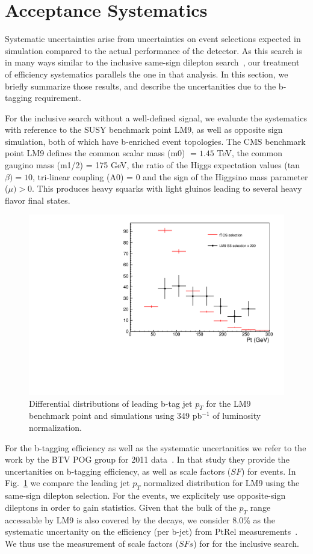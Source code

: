 \section{Acceptance Systematics}
\label{sec:systematic}
Systematic uncertainties arise from uncertainties on event selections expected in simulation compared to the actual performance of 
the detector. As this search is in many ways similar to the inclusive same-sign dilepton search~\cite{ssnote2011}, 
our treatment of efficiency systematics parallels the one in that analysis.
In this section, we briefly summarize those results, and
describe the uncertanities due to the b-tagging requirement.

For the inclusive search without a well-defined signal, 
we evaluate the systematics with reference to the SUSY benchmark point LM9, 
as well as opposite sign \ttbar simulation, both of which have b-enriched event topologies. The CMS benchmark point LM9 defines the 
common scalar mass (m0) $ = 1.45$ TeV, the common gaugino mass (m1/2) = 175 GeV, the ratio of the Higgs expectation
values (tan$\beta)  = 10$, tri-linear coupling (A0) = 0 and the  sign of the Higgsino mass parameter ($\mu) > 0$. This produces heavy squarks
with light gluinos leading to several heavy flavor final states.

\begin{figure}[htb]
\begin{center}
\includegraphics[width=0.6\linewidth, height=0.36\linewidth]{figs/bjetleading.pdf}
\caption{ Differential distributions of leading b-tag jet $p_T$ for the LM9 benchmark point and \ttbar simulations using 349 pb$^{-1}$ of luminosity normalization.\label{fig:lm9ttbar}}
\end{center}
\end{figure}

For the b-tagging efficiency as well as the systematic uncertanities we refer to the
work by the BTV POG group for 2011
data~\cite{BTVPAS2011}. In that study they provide the uncertanities on b-tagging efficiency, 
as well as scale factors ($SF$) for \ttbar events. In Fig.~\ref{fig:lm9ttbar} 
we compare the leading jet $p_T$ normalized distribution for LM9 using the same-sign dilepton selection. For the \ttbar events, we 
explicitely use opposite-sign dileptons in order to gain statistics. Given that the bulk of the $p_T$ range accessable by LM9 is also covered by the \ttbar decays, 
we consider 8.0\% as the systematic uncertanity on the efficiency (per b-jet) from PtRel measurements~\cite{BTVPAS2011}. We thus use the measurement of scale factors ($SFs$) 
for \ttbar for the inclusive search.

